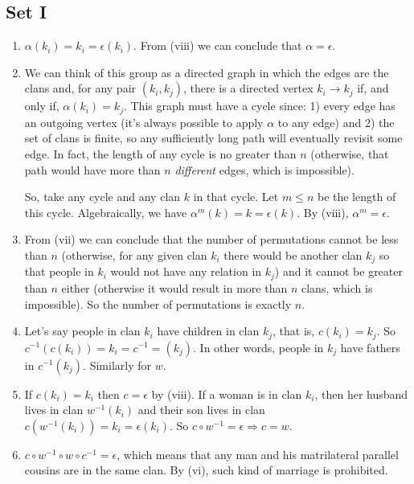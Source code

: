 \documentclass{article}
\begin{document}
\subsection{Set I}
\begin{enumerate}
    \item $\alpha(k_i) = k_i = \epsilon(k_i)$. From (viii) we can conclude that $\alpha = \epsilon$.

    \item We can think of this group as a directed graph in which the edges are the clans and, for any pair $(k_i, k_j)$, there is a directed vertex $k_i \to k_j$ if, and only if, $\alpha(k_i) = k_j$. This graph must have a cycle since: 1) every edge has an outgoing vertex (it's always possible to apply $\alpha$ to any edge) and 2) the set of clans is finite, so any sufficiently long path will eventually revisit some edge. In fact, the length of any cycle is no greater than $n$ (otherwise, that path would have more than $n$ \emph{different} edges, which is impossible).

    So, take any cycle and any clan $k$ in that cycle. Let $m \leqslant n$ be the length of this cycle. Algebraically, we have $\alpha^m(k) = k = \epsilon(k)$. By (viii), $\alpha^m = \epsilon$.

    \item From (vii) we can conclude that the number of permutations cannot be less than $n$ (otherwise, for any given clan $k_i$ there would be another clan $k_j$ so that people in $k_i$ would not have any relation in $k_j$) and it cannot be greater than $n$ either
     (otherwise it would result in more than $n$ clans, which is impossible). So the number of permutations is exactly $n$.

    \item Let's say people in clan $k_i$ have children in clan $k_j$, that is, $c(k_i) = k_j$. So $c^{-1}(c(k_i)) = k_i = c^{-1} = (k_j)$. In other words, people in $k_j$ have fathers in $c^{-1}(k_j)$. Similarly for $w$.

    \item If $c(k_i) = k_i$ then $c = \epsilon$ by (viii). If a woman is in clan $k_i$, then her husband lives in clan $w^{-1}(k_i)$ and their son lives in clan $c(w^{-1}(k_i)) = k_i = \epsilon(k_i)$. So $c \circ w^{-1} = \epsilon \Rightarrow c = w$.

    \item $c \circ w^{-1} \circ w \circ c^{-1} = \epsilon$, which means that any man and his matrilateral parallel cousins are in the same clan. By (vi), such kind of marriage is prohibited.


\end{enumerate}
\end{document}
